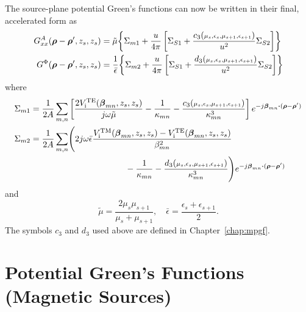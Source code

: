 The source-plane potential Green's functions can now be written in
their final, accelerated form as
\begin{subequations}
  \label{eq:finalEGF}
  \begin{align}
    G^A_{xx}(\boldsymbol{\rho}-\boldsymbol{\rho}',z_s,z_s) &=  
    \tilde{\mu}
    \biggl\{
    \Sigma_{m1} + 
    \frac{u}{4\pi}
    \left[
      \Sigma_{S1} + \frac{c_3({\scriptstyle
          \mu_s,\epsilon_s,\mu_{s+1},\epsilon_{s+1}})}{u^2} \Sigma_{S2}
    \right]
    \biggr\} \\
    G^\Phi(\boldsymbol{\rho}-\boldsymbol{\rho}',z_s,z_s) &=
    \frac{1}{\bar{\epsilon}}
    \biggl\{
    \Sigma_{m2} +
    \frac{u}{4\pi}
    \left[
      \Sigma_{S1} + \frac{d_3({\scriptstyle
          \mu_s,\epsilon_s,\mu_{s+1},\epsilon_{s+1}})}{u^2} \Sigma_{S2}
    \right]
    \biggr\} 
  \end{align}
\end{subequations}
where
\begin{subequations}
  \begin{align}
    \Sigma_{m1} &= 
    \frac{1}{2A} \summn
    \left[
      \frac{2\Vi\TE({\vecbeta_{mn},z_s,z_s})}{j\omega\tilde{\mu}} 
      - \frac{1}{\kappa_{mn}} -
      \frac{c_3({\scriptstyle\mu_s,\epsilon_s,\mu_{s+1},\epsilon_{s+1}})}{\kappa_{mn}^3}
    \right]  e^{-j\vecbeta_{mn}\bdot(\vecrho-\vecrho')} \\
    \Sigma_{m2} &= 
    \frac{1}{2A} \summn
    \Biggl(
    2j\omega\bar{\epsilon}
    \frac{\Vi\TM({\vecbeta_{mn},z_s,z_s})-\Vi\TE({\vecbeta_{mn},z_s,z_s})}%
    {\beta_{mn}^2}  \nonumber \\
    & \mbox{} \mkern 200mu - \frac{1}{\kappa_{mn}} -
    \frac{d_3({\scriptstyle\mu_s,\epsilon_s,\mu_{s+1},\epsilon_{s+1}})}{\kappa_{mn}^3}
    \Biggr)  e^{-j\vecbeta_{mn}\bdot(\vecrho-\vecrho')} 
  \end{align}
  \label{eq:finalmodalelectric}
\end{subequations}
and
\begin{equation}
  \tilde{\mu} =
  \frac{2\mu_s\mu_{s+1}}{\mu_s+\mu_{s+1}},
  \quad
  \bar{\epsilon} = \frac{\epsilon_s + \epsilon_{s+1}}{2}.
\end{equation}
The symbols $c_3$ and $d_3$ used above are defined in Chapter~\ref{chap:mpgf}.






\section{Potential Green's Functions (Magnetic Sources)}

